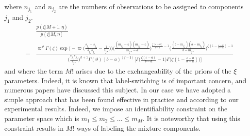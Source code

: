 \documentclass[journal,10pt]{elsart}
\begin{document}
where $n_{j_{1}}$ and $n_{j_{2}}$ are the numbers of observations to be assigned to components $j_1$ and $j_2$.
\begin{eqnarray}
&&\frac{p(\xi|M+1,\eta)}{p(\xi|M,\eta)}\\\nonumber&=&\frac{\varpi^{\vartheta}\Gamma(\zeta) \exp\bigg(-\varpi\big(
\frac{s_{j_1}+s_{j_2}}{s_{j_1}s_{j_2}}-\frac{1}{s_{j*}}\big)\bigg)\bigg(\frac{({m}_{j_1}-a)({m}_{j_2}-a)}{{m}_{j*}-a}\bigg)^{\frac{\zeta(\varepsilon-a)}{b-a}-1}\bigg(\frac{(b-{m}_{j_1})(b-{m}_{j_2})}{b-{m}_{j*}}\bigg)^{\zeta(1-\frac{\varepsilon-a}{b-a})-1}}{\big(\frac{s_{j_1}s_{j_2}}{s_{j*}}\big)^{\vartheta+1}\Gamma(\vartheta)(b-a)^{(\zeta-1)}\bigg[\Gamma\big(\frac{\zeta(\varepsilon-a)}{b-a}-1\big)\Gamma\big(\zeta(1-\frac{\varepsilon-a}{b-a})\big)\bigg]}
\end{eqnarray}
and where the term $M!$ arises due to the exchangeability of the priors of the $\xi$ parameters.
Indeed, it is known that label-switching is of important concern, and numerous papers have discussed this subject.
In our case we have adopted a simple approach that has been found effective in practice and according to our experimental results.
Indeed, we impose an identifiability constraint on the parameter space which is $m_1 \leq m_2 \leq \ldots \leq m_M$.
It is noteworthy that using this constraint results in $M!$ ways of labeling the mixture components.
\end{document}
